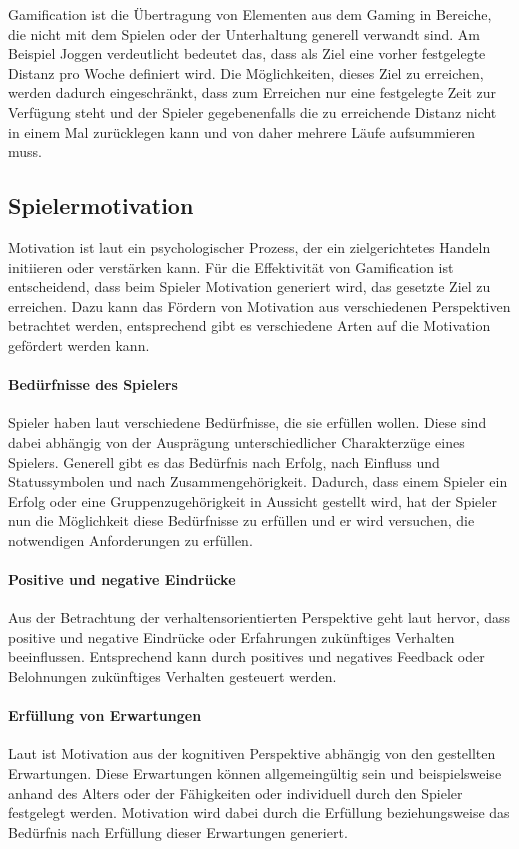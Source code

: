 \documentclass[
	oneside,  %
	ngerman, 
	final, 
	11pt, 
	a4paper, 
	1.1headlines, 
	headinclude=false, 
	footinclude=false, 
	mpinclude=false, 
	pagesize, 
	onecolumn, 
	titlepage, 
	parskip=half, 
	headsepline, 
	chapterprefix=false, 
	version=first, 
	listof=totoc, 
	bibliography=totoc, 
	toc=graduated, 
	fleqn
]{scrbook}
\begin{document}
Gamification ist die Übertragung von Elementen aus dem Gaming in Bereiche, die nicht mit dem Spielen oder der Unterhaltung generell verwandt sind.
Am Beispiel Joggen verdeutlicht bedeutet das, dass als Ziel eine vorher festgelegte Distanz pro Woche definiert wird.
Die Möglichkeiten, dieses Ziel zu erreichen, werden dadurch eingeschränkt, dass zum Erreichen nur eine festgelegte Zeit zur Verfügung steht und der Spieler gegebenenfalls die zu erreichende Distanz nicht in einem Mal zurücklegen kann und von daher mehrere Läufe aufsummieren muss.

\subsection{Spielermotivation}
\label{Spielermotivation}
Motivation ist laut \cite{SH2014} ein psychologischer Prozess, der ein zielgerichtetes Handeln initiieren oder verstärken kann.
Für die Effektivität von Gamification ist entscheidend, dass beim Spieler Motivation generiert wird, das gesetzte Ziel zu erreichen.
Dazu kann das Fördern von Motivation aus verschiedenen Perspektiven betrachtet werden, entsprechend gibt es verschiedene Arten auf die Motivation gefördert werden kann.

\paragraph{Bedürfnisse des Spielers}
Spieler haben laut \cite{SH2014} verschiedene Bedürfnisse, die sie erfüllen wollen.
Diese sind dabei abhängig von der Ausprägung unterschiedlicher Charakterzüge eines Spielers.
Generell gibt es das Bedürfnis nach Erfolg, nach Einfluss und Statussymbolen und nach Zusammengehörigkeit.
Dadurch, dass einem Spieler ein Erfolg oder eine Gruppenzugehörigkeit in Aussicht gestellt wird, hat der Spieler nun die Möglichkeit diese Bedürfnisse zu erfüllen und er wird versuchen, die notwendigen Anforderungen zu erfüllen.

\paragraph{Positive und negative Eindrücke}
Aus der Betrachtung der verhaltensorientierten Perspektive geht laut \cite{SH2014} hervor, dass positive und negative Eindrücke oder Erfahrungen zukünftiges Verhalten beeinflussen.
Entsprechend kann durch positives und negatives Feedback oder Belohnungen zukünftiges Verhalten gesteuert werden.

\paragraph{Erfüllung von Erwartungen}
Laut \cite{SH2014} ist Motivation aus der kognitiven Perspektive abhängig von den gestellten Erwartungen.
Diese Erwartungen können allgemeingültig sein und beispielsweise anhand des Alters oder der Fähigkeiten oder individuell durch den Spieler festgelegt werden.
Motivation wird dabei durch die Erfüllung beziehungsweise das Bedürfnis nach Erfüllung dieser Erwartungen generiert.
\end{document}
